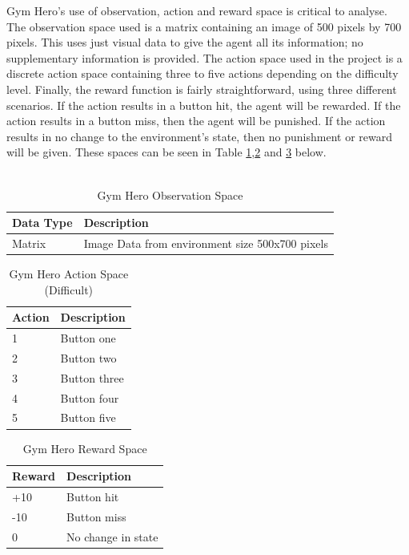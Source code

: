 \documentclass[a4paper,12pt]{article}
\begin{document}
Gym Hero's use of observation, action and reward space is critical to analyse. The observation space used is a matrix containing an image of 500 pixels by 700 pixels. This uses just visual data to give the agent all its information; no supplementary information is provided. The action space used in the project is a discrete action space containing three to five actions depending on the difficulty level. Finally, the reward function is fairly straightforward, using three different scenarios. If the action results in a button hit, the agent will be rewarded. If the action results in a  button miss, then the agent will be punished. If the action results in no change to the environment's state, then no punishment or reward will be given. These spaces can be seen in Table \ref{tab:Gym Hero Observation Space},\ref{tab:Gym Hero Action Space} and \ref{tab:Gym Hero Reward Space} below.
\\\\
\begin{table}[H]
\centering
\caption{Gym Hero Observation Space}
\label{tab:Gym Hero Observation Space}
\begin{tabular}{|ll|}
\hline
\textbf{Data Type} & \textbf{Description}\\ \hline
Matrix & Image Data from environment size 500x700 pixels\\ \hline
\end{tabular}
\end{table}

\begin{table}[H]
\centering
\caption{Gym Hero Action Space (Difficult)}
\label{tab:Gym Hero Action Space}
\begin{tabular}{|ll|}
\hline
\textbf{Action} & \textbf{Description}\\ \hline
1 & Button one \\ \hline
2 & Button two \\ \hline
3 & Button three \\ \hline
4 & Button four \\ \hline
5 & Button five \\ \hline
\end{tabular}
\end{table}

\begin{table}[H]
\centering
\caption{Gym Hero Reward Space}
\label{tab:Gym Hero Reward Space}
\begin{tabular}{|ll|}
\hline
\textbf{Reward} & \textbf{Description}\\ \hline
+10 & Button hit \\ \hline
-10 & Button miss \\ \hline
0 & No change in state \\ \hline
\end{tabular}
\end{table}
\end{document}

